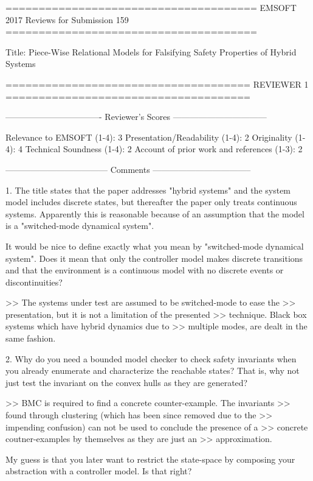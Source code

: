 \obeyspaces
\obeylines
======================================
EMSOFT 2017 Reviews for Submission 159
======================================

Title: Piece-Wise Relational Models for Falsifying Safety Properties of Hybrid Systems

=====================================
                            REVIEWER 1
=====================================


----------------------------------
Reviewer's Scores
---------------------------------

               Relevance to EMSOFT (1-4): 3
          Presentation/Readability (1-4): 2
                       Originality (1-4): 4
               Technical Soundness (1-4): 2
Account of prior work and references (1-3): 2


------------------------------------
Comments
-----------------------------------


1. The title states that the paper addresses "hybrid systems" and the system
   model includes discrete states, but thereafter the paper only treats
   continuous systems. Apparently this is reasonable because of an
   assumption that the model is a "switched-mode dynamical system".

   It would be nice to define exactly what you mean by "switched-mode
   dynamical system". Does it mean that only the controller model makes
   discrete transitions and that the environment is a continuous model with
   no discrete events or discontinuities?

>> The systems under test are assumed to be switched-mode to ease the
>> presentation, but it is not a limitation of the presented
>> technique. Black box systems which have hybrid dynamics due to
>> multiple modes, are dealt in the same fashion.

2. Why do you need a bounded model checker to check safety invariants when
   you already enumerate and characterize the reachable states? That is, why
   not just test the invariant on the convex hulls as they are generated?

>> BMC is required to find a concrete counter-example. The invariants
>> found through clustering (which has been since removed due to the
>> impending confusion) can not be used to conclude the presence of a
>> concrete coutner-examples by themselves as they are just an
>> approximation.

   My guess is that you later want to restrict the state-space by composing
   your abstraction with a controller model. Is that right?

